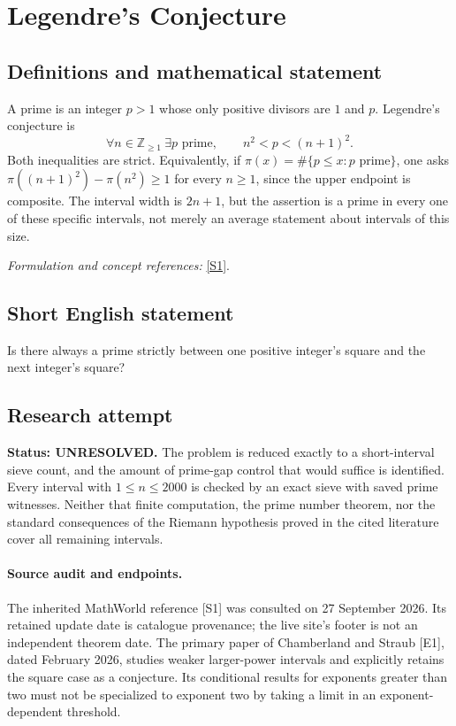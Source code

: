 \documentclass[11pt]{article}
\begin{document}
\section*{\texorpdfstring{Legendre's Conjecture}{Legendre's Conjecture}}\label{statement}
\subsection{Definitions and mathematical statement}
A prime is an integer $p>1$ whose only positive divisors are $1$ and $p$. Legendre's conjecture is
\[
 \forall n\in{\mathbb{Z}}_{\ge1}\ \exists p\text{ prime},
 \qquad n^2<p<(n+1)^2.
\]
Both inequalities are strict. Equivalently, if $\pi(x)=\#\{p\le x:p\text{ prime}\}$, one asks $\pi((n+1)^2)-\pi(n^2)\ge1$ for every $n\ge1$, since the upper endpoint is composite. The interval width is $2n+1$, but the assertion is a prime in every one of these specific intervals, not merely an average statement about intervals of this size.
\par\smallskip\textit{Formulation and concept references:} \href{https://mathworld.wolfram.com/LegendresConjecture.html}{[S1]}.

\subsection{Short English statement}
Is there always a prime strictly between one positive integer's square and the next integer's square?
\subsection{Research attempt}
\textbf{Status: UNRESOLVED.} The problem is reduced exactly to a short-interval sieve count, and the amount of prime-gap control that would suffice is identified. Every interval with $1\le n\le2000$ is checked by an exact sieve with saved prime witnesses. Neither that finite computation, the prime number theorem, nor the standard consequences of the Riemann hypothesis proved in the cited literature cover all remaining intervals.

\paragraph{Source audit and endpoints.}
The inherited MathWorld reference [S1] was consulted on 27 September 2026. Its retained update date is catalogue provenance; the live site's footer is not an independent theorem date. The primary paper of Chamberland and Straub [E1], dated February 2026, studies weaker larger-power intervals and explicitly retains the square case as a conjecture. Its conditional results for exponents greater than two must not be specialized to exponent two by taking a limit in an exponent-dependent threshold.
\end{document}

